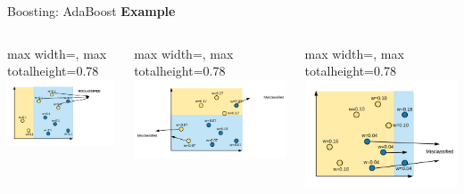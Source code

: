 \documentclass[aspectratio=169,10pt]{beamer}
\newcommand{\fitpic}[1]{\begin{adjustbox}{max width=\linewidth, max totalheight=0.78\textheight}#1\end{adjustbox}}
\begin{document}
\begin{frame}{Boosting: AdaBoost}
  \textbf{Example}
  \begin{columns}
    \pause\begin{column}{0.33\textwidth}\centering
      \fitpic{\includegraphics[width=\linewidth]{../assets/ensemble/diagrams/ada_iter1_misclassify}}
      \vspace{-8pt}
    \end{column}
    \pause\begin{column}{0.33\textwidth}\centering
      \fitpic{\includegraphics[width=\linewidth]{../assets/ensemble/diagrams/ada_iter2_misclassify}}
      \vspace{-8pt}
    \end{column}
    \pause\begin{column}{0.33\textwidth}\centering
      \fitpic{\includegraphics[width=\linewidth]{../assets/ensemble/diagrams/ada_iter3_misclassify}}

\end{column}
\end{columns}
\end{frame}
\end{document}
